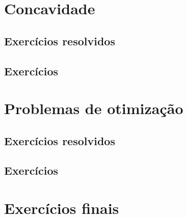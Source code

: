 \section{Concavidade}
\construirSec

\subsection*{Exercícios resolvidos}

\construirExeresol


\subsection*{Exercícios}

\construirExer


\section{Problemas de otimização}
\construirSec

\subsection*{Exercícios resolvidos}

\construirExeresol


\subsection*{Exercícios}

\construirExer


\section{Exercícios finais}

\construirExer


